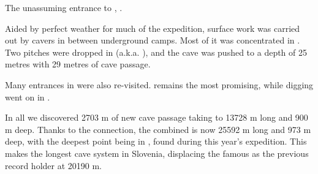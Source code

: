 \begin{marginfigure}
\checkoddpage \ifoddpage \forcerectofloat \else \forceversofloat \fi
\centering
 \caption{The unassuming entrance to , . }
 \label{m2 entrance}
\end{marginfigure}

Aided by perfect weather for much of the expedition, surface work was
carried out by cavers in between underground camps. Most of it was
concentrated in . Two pitches were dropped in  (a.k.a.
), and the cave was pushed to a depth of 25 metres with 29 metres of cave passage.

Many entrances in  were also re-visited.  remains the most
promising, while digging went on in .

In all we discovered 2703 m of new cave passage taking 
to 13728 m long and 900 m deep. Thanks to the connection, the combined
 is now 25592 m long and 973 m deep, with the deepest
point being  in , found during this
year's expedition. This makes  the longest cave system in
Slovenia, displacing the famous  as the previous record
holder at 20190 m.

